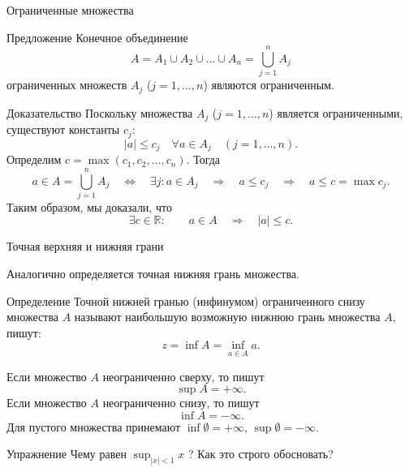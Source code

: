 \documentclass[8pt]{beamer}
\begin{document}
\begin{frame}{Ограниченные множества}
\begin{block}{Предложение}
Конечное объединение
$$A=A_1 \cup A_2 \cup \ldots \cup A_n=\bigcup_{j=1}^n A_j$$
ограниченных множеств $A_j$ ($j=1,\ldots,n$) являются ограниченным.
\end{block}
\begin{block}{Доказательство}
Поскольку множества $A_j$ ($j=1,\ldots,n$) является ограниченными, существуют константы $c_j$:
$$|a|\le c_j \quad \forall a\in A_j \quad (j=1,\ldots,n).$$
Определим $c=\max( c_1, c_2, \ldots, c_n )$. Тогда
$$
a\in A=\bigcup_{j=1}^n A_j \quad \Leftrightarrow \quad 
\exists j: a\in A_j \quad \Rightarrow \quad
a\le c_j \quad \Rightarrow \quad
a \le c=\max c_j.
$$
Таким образом, мы доказали, что
$$\exists c\in \mathbb{R}:\qquad  a\in A \quad \Rightarrow \quad |a|\le c.$$
\end{block}
\end{frame}


\begin{frame}{Точная верхняя и нижняя грани}

Аналогично определяется точная нижняя грань множества.

\begin{block}{Определение}
Точной нижней гранью (инфинумом) ограниченного снизу множества $A$ называют наибольшую возможную нижнюю грань множества $A$, пишут:
$$z=\inf A= \inf_{a\in A} a.$$
\end{block}
Если множество $A$ неограниченно сверху, то пишут
$$\sup A = +\infty.$$
Если множество $A$ неограниченно снизу, то пишут
$$\inf A = -\infty.$$
Для пустого множества принемают $\inf\emptyset = +\infty$, $\sup\emptyset = -\infty$.

\begin{block}{Упражнение}
Чему равен $\displaystyle \sup_{|x|<1} x$ ? Как это строго обосновать?
\end{block}

\end{frame}
\end{document}
